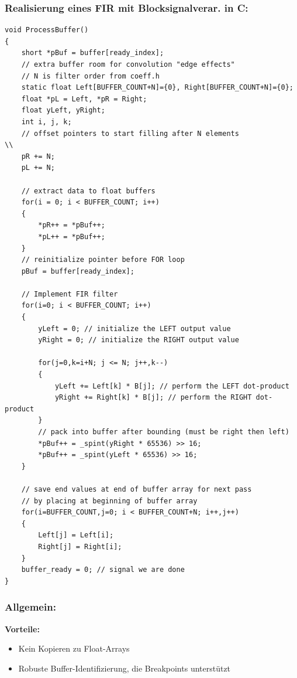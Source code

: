 \documentclass[10pt,a4paper]{article}
\begin{document}
\subsubsection{Realisierung eines FIR mit Blocksignalverar. in C:}
\begin{verbatim}
void ProcessBuffer()
{
    short *pBuf = buffer[ready_index];
    // extra buffer room for convolution "edge effects"
    // N is filter order from coeff.h
    static float Left[BUFFER_COUNT+N]={0}, Right[BUFFER_COUNT+N]={0};
    float *pL = Left, *pR = Right;
    float yLeft, yRight;
    int i, j, k;
    // offset pointers to start filling after N elements
\\
    pR += N;
    pL += N;

    // extract data to float buffers
    for(i = 0; i < BUFFER_COUNT; i++) 
    { 
        *pR++ = *pBuf++;
        *pL++ = *pBuf++;
    }
    // reinitialize pointer before FOR loop
    pBuf = buffer[ready_index];

    // Implement FIR filter
    for(i=0; i < BUFFER_COUNT; i++) 
    {
        yLeft = 0; // initialize the LEFT output value
        yRight = 0; // initialize the RIGHT output value

        for(j=0,k=i+N; j <= N; j++,k--) 
        {
            yLeft += Left[k] * B[j]; // perform the LEFT dot-product
            yRight += Right[k] * B[j]; // perform the RIGHT dot-product
        }
        // pack into buffer after bounding (must be right then left)
        *pBuf++ = _spint(yRight * 65536) >> 16;
        *pBuf++ = _spint(yLeft * 65536) >> 16;
    }

    // save end values at end of buffer array for next pass
    // by placing at beginning of buffer array
    for(i=BUFFER_COUNT,j=0; i < BUFFER_COUNT+N; i++,j++) 
    {
        Left[j] = Left[i];
        Right[j] = Right[i];
    }
    buffer_ready = 0; // signal we are done
}
\end{verbatim}
\newpage
\subsubsection{Allgemein:}
\textbf{Vorteile:}
\begin{itemize}
  \item Kein Kopieren zu Float-Arrays
  \item Robuste Buffer-Identifizierung, die Breakpoints unterstützt
\end{itemize}
\end{document}
